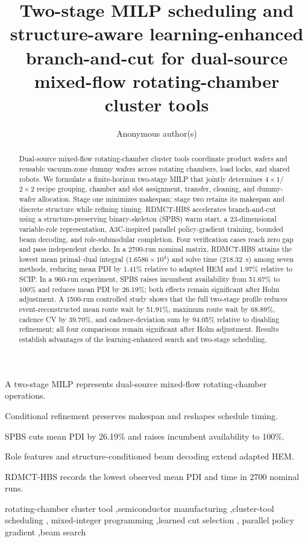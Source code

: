 \documentclass[preprint,12pt,authoryear]{elsarticle}
\begin{document}
\begin{frontmatter}

\title{Two-stage MILP scheduling and structure-aware learning-enhanced
branch-and-cut for dual-source mixed-flow rotating-chamber cluster tools}

\author{Anonymous author(s)}

\begin{abstract}
Dual-source mixed-flow rotating-chamber cluster tools coordinate product
wafers and reusable vacuum-zone dummy wafers across rotating chambers, load
locks, and shared robots. We formulate a finite-horizon two-stage MILP that
jointly determines $4\times1$/$2\times2$ recipe grouping, chamber and slot
assignment, transfer, cleaning, and dummy-wafer allocation. Stage one
minimizes makespan; stage two retains its makespan and discrete structure
while refining timing. RDMCT-HBS accelerates branch-and-cut using a
structure-preserving binary-skeleton
(SPBS) warm start, a 23-dimensional variable-role representation,
A3C-inspired parallel policy-gradient training, bounded beam decoding, and
role-submodular completion. Four verification cases reach zero gap and pass
independent checks. In a 2700-run nominal matrix, RDMCT-HBS attains the lowest
mean primal--dual integral
($1.6586\times10^4$) and solve time (218.32~s) among seven methods, reducing
mean PDI by 1.41\% relative to adapted HEM and 1.97\% relative to SCIP. In a
960-run experiment, SPBS raises incumbent availability from
51.67\% to 100\% and reduces mean PDI by 26.19\%; both effects remain
significant after Holm adjustment. A 1500-run controlled study shows that
the full two-stage profile reduces event-reconstructed mean route wait by
51.91\%, maximum route wait by 68.89\%, cadence CV by 39.70\%, and
cadence-deviation sum by 94.05\% relative to disabling refinement; all four
comparisons remain significant after Holm adjustment. Results establish
advantages of the learning-enhanced search and two-stage scheduling.
\end{abstract}

\begin{highlights}
\item A two-stage MILP represents dual-source mixed-flow rotating-chamber operations.
\item Conditional refinement preserves makespan and reshapes schedule timing.
\item SPBS cuts mean PDI by 26.19\% and raises incumbent availability to 100\%.
\item Role features and structure-conditioned beam decoding extend adapted HEM.
\item RDMCT-HBS records the lowest observed mean PDI and time in 2700 nominal runs.
\end{highlights}

\begin{keyword}
rotating-chamber cluster tool \sep semiconductor manufacturing \sep cluster-tool scheduling \sep
mixed-integer programming \sep learned cut selection \sep
parallel policy gradient \sep beam search
\end{keyword}

\end{frontmatter}
\end{document}
